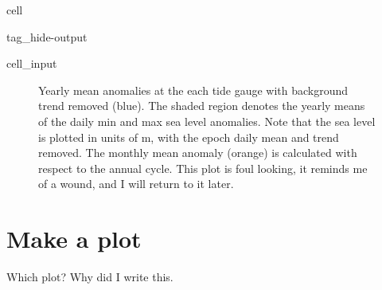 \documentclass[letterpaper,10pt,english]{jupyterBook}
\begin{document}
\begin{sphinxuseclass}{cell}
\begin{sphinxuseclass}{tag_hide-output}
\begin{sphinxVerbatimInput}
\begin{sphinxuseclass}{cell_input}
\begin{sphinxVerbatim}[commandchars=\\\{\}]
    
   


    

\end{sphinxVerbatim}

\end{sphinxuseclass}\end{sphinxVerbatimInput}

\end{sphinxuseclass}
\end{sphinxuseclass}
\begin{figure}[htbp]
\centering
\capstart

\noindent{}
\caption{Yearly mean anomalies at the each tide gauge with background trend removed (blue). The shaded region denotes the yearly means of the daily min and max sea level anomalies. Note that the sea level is plotted in units of m, with the epoch daily mean and trend removed. The monthly mean anomaly (orange) is calculated with respect to the annual cycle. This plot is foul looking, it reminds me of a wound, and I will return to it later.}\label{\detokenize{notebooks/regional_and_local/SL_anomaly_annual:sl-mma-annual}}\end{figure}


\part{Make a plot}
\label{\detokenize{notebooks/regional_and_local/SL_anomaly_annual:make-a-plot}}
\sphinxAtStartPar
Which plot? Why did I write this.







\renewcommand{\indexname}{Index}
\printindex
\end{document}
